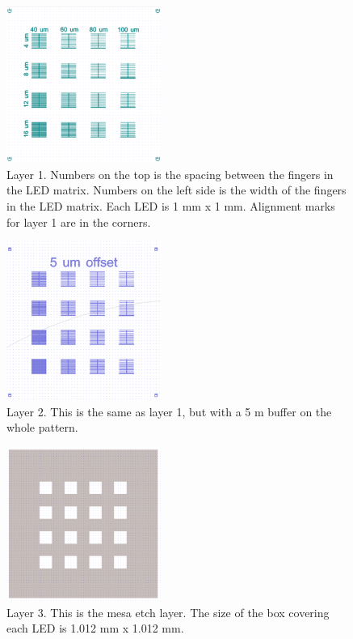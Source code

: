 \begin{figure}[ht]
    \centering
    \includegraphics[width=0.45\textwidth]{figures/CleWin_L1.png}
    \caption{
        Layer 1. 
        Numbers on the top is the spacing between the fingers in the LED matrix.
        Numbers on the left side is the width of the fingers in the LED matrix.
        Each LED is 1 mm x 1 mm. 
        Alignment marks for layer 1 are in the corners. 
    }
    \label{fig:CleWin_L1}
\end{figure}


\begin{figure}[ht]
    \centering
    \includegraphics[width=0.45\textwidth]{figures/CleWin_L2.png}
    \caption{
        Layer 2. 
        This is the same as layer 1, but with a 5 \textmu m buffer on the whole pattern. 
    }
    \label{fig:CleWin_L2}
\end{figure}


\begin{figure}[ht]
    \centering
    \includegraphics[width=0.45\textwidth]{figures/CleWin_L3.png}
    \caption{
        Layer 3. 
        This is the mesa etch layer. 
        The size of the box covering each LED is 1.012 mm x 1.012 mm.
    }
    \label{fig:CleWin_L3}
\end{figure}

